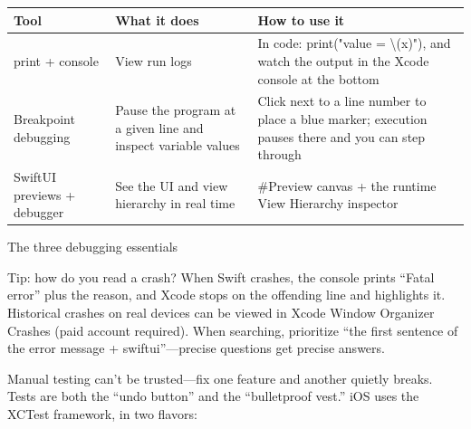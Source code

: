 


\begin{center}
\begin{tabularx}{\linewidth}{|X|X|X|}
\hline
\textbf{Tool} & \textbf{What it does} & \textbf{How to use it} \tabularnewline
\hline
print + console & View run logs & In code: print("value = \textbackslash{}(x)"), and watch the output in the Xcode console at the bottom \tabularnewline
Breakpoint debugging & Pause the program at a given line and inspect variable values & Click next to a line number to place a blue marker; execution pauses there and you can step through \tabularnewline
SwiftUI previews + debugger & See the UI and view hierarchy in real time & \#Preview canvas + the runtime View Hierarchy inspector \tabularnewline
\hline
\end{tabularx}
\end{center}

\begin{center}\small\color{gray}The three debugging essentials\end{center}

\begin{tcbinfo}{Tip: how do you read a crash?}
When Swift crashes, the console prints “Fatal error” plus the reason, and Xcode stops on the offending line and highlights it. Historical crashes on real devices can be viewed in Xcode Window Organizer Crashes (paid account required). When searching, prioritize “the first sentence of the error message + swiftui”—precise questions get precise answers.

\end{tcbinfo}


Manual testing can't be trusted—fix one feature and another quietly breaks. Tests are both the “undo button” and the “bulletproof vest.” iOS uses the XCTest framework, in two flavors:

